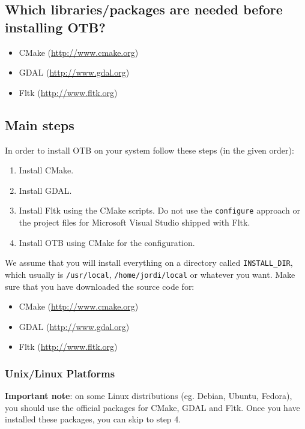 \subsection{Which libraries/packages are needed before installing
 OTB?}
\begin{itemize}
\item CMake (\url{http://www.cmake.org})
\item GDAL (\url{http://www.gdal.org})
\item Fltk (\url{http://www.fltk.org})
\end{itemize}
       
\subsection{Main steps}
In order to install OTB on your system follow these steps (in the
given order):
\begin{enumerate}
  \item Install CMake.
  \item Install GDAL.
  \item Install Fltk using the CMake scripts. Do not use the
  \texttt{configure} approach or the project files for Microsoft
  Visual Studio shipped with Fltk.
  \item Install OTB using CMake for the configuration.
\end{enumerate}

We assume that you will install everything on a directory called
\texttt{INSTALL\_DIR}, which usually is \texttt{/usr/local}, \texttt{/home/jordi/local} or
whatever you want. Make sure that you have downloaded the source code for:
  \begin{itemize}
  \item CMake (\url{http://www.cmake.org})
  \item GDAL (\url{http://www.gdal.org})
  \item Fltk (\url{http://www.fltk.org})
  \end{itemize}

\subsubsection{Unix/Linux Platforms}

\textbf{Important note}: on some Linux distributions (eg. Debian, Ubuntu, Fedora), you should use 
the official packages for CMake, GDAL and Fltk. Once you have installed these 
packages, you can skip to step 4.

